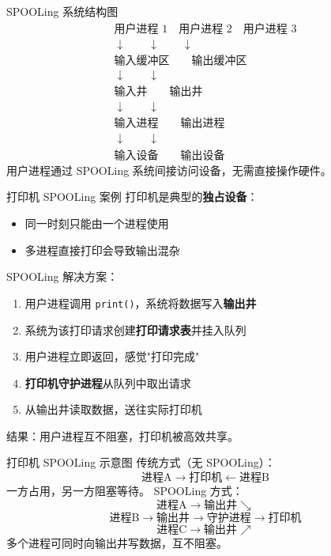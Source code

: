 \documentclass[10pt, aspectratio=169]{beamer}
\begin{document}
\begin{frame}{SPOOLing 系统结构图}
    \[
    \begin{array}{c}
        \text{用户进程 1} \quad \text{用户进程 2} \quad \text{用户进程 3} \\
        \downarrow \qquad \downarrow \qquad \downarrow \\
        \boxed{\text{输入缓冲区}} \qquad \boxed{\text{输出缓冲区}} \\
        \downarrow \qquad \downarrow \\
        \boxed{\text{输入井}} \qquad \boxed{\text{输出井}} \\
        \downarrow \qquad \downarrow \\
        \boxed{\text{输入进程}} \qquad \boxed{\text{输出进程}} \\
        \downarrow \qquad \downarrow \\
        \text{输入设备} \qquad \text{输出设备}
    \end{array}
    \]
    \vspace{0.5em}
    用户进程通过 SPOOLing 系统间接访问设备，无需直接操作硬件。
\end{frame}

\begin{frame}{打印机 SPOOLing 案例}
    打印机是典型的\textbf{独占设备}：
    \begin{itemize}
        \item 同一时刻只能由一个进程使用
        \item 多进程直接打印会导致输出混杂
    \end{itemize}
    \vspace{0.5em}
    SPOOLing 解决方案：
    \vspace{0.5em}
    \begin{enumerate}
        \item 用户进程调用 \texttt{print()}，系统将数据写入\textbf{输出井}
        \item 系统为该打印请求创建\textbf{打印请求表}并挂入队列
        \item 用户进程立即返回，感觉"打印完成"
        \item \textbf{打印机守护进程}从队列中取出请求
        \item 从输出井读取数据，送往实际打印机
    \end{enumerate}
    \vspace{0.5em}
    结果：用户进程互不阻塞，打印机被高效共享。
\end{frame}

\begin{frame}{打印机 SPOOLing 示意图}
    传统方式（无 SPOOLing）：
    \[
    \text{进程A} \rightarrow \boxed{\text{打印机}} \leftarrow \text{进程B}
    \]
    一方占用，另一方阻塞等待。
    \vspace{0.5em}
    SPOOLing 方式：
    \[
    \text{进程A} \rightarrow \boxed{\text{输出井}} \searrow
    \]
    \[
    \text{进程B} \rightarrow \boxed{\text{输出井}} \rightarrow
    \boxed{\text{守护进程}} \rightarrow \boxed{\text{打印机}}
    \]
    \[
    \text{进程C} \rightarrow \boxed{\text{输出井}} \nearrow
    \]
    \vspace{0.5em}
    多个进程可同时向输出井写数据，互不阻塞。
\end{frame}
\end{document}
